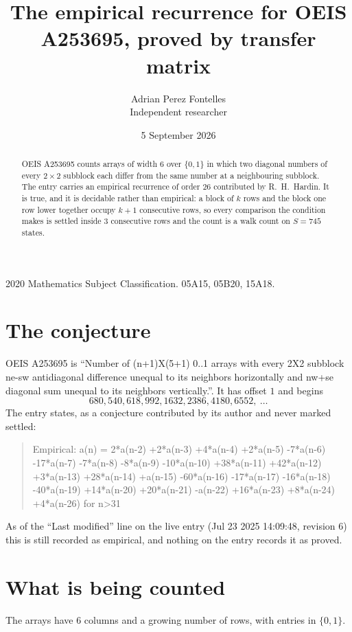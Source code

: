 \documentclass[11pt,a4paper]{article}
\title{The empirical recurrence for OEIS A253695, proved by transfer matrix}
\author{Adrian Perez Fontelles\\ \small Independent researcher}
\date{5 September 2026}
\theoremstyle{plain}
\theoremstyle{definition}
\begin{document}
\maketitle

\begin{abstract}
OEIS A253695 counts arrays of width $6$ over $\{0,1\}$ in which two diagonal numbers of every $2\times2$ subblock each differ from the same number at a neighbouring subblock. The entry carries an
empirical recurrence of order $26$ contributed by R.~H.~Hardin. It is true, and it is
decidable rather than empirical: a block of $k$ rows and the block one row lower together
occupy $k+1$ consecutive rows, so every comparison the condition makes is settled inside
$3$ consecutive rows and the count is a walk count on $S=745$ states.
\end{abstract}

\noindent\small 2020 Mathematics Subject Classification. 05A15, 05B20, 15A18.\normalsize

\section{The conjecture}

OEIS A253695 is ``Number of (n+1)X(5+1) 0..1 arrays with every 2X2 subblock ne-sw antidiagonal difference unequal to its neighbors horizontally and nw+se diagonal sum unequal to its neighbors vertically.''. It has offset $1$ and begins
\[
680, 540, 618, 992, 1632, 2386, 4180, 6552,\ \dots
\]
The entry states, as a conjecture contributed by its author and never marked settled:
\begin{quote}
Empirical: a(n) = 2*a(n-2) +2*a(n-3) +4*a(n-4) +2*a(n-5) -7*a(n-6) -17*a(n-7) -7*a(n-8) -8*a(n-9) -10*a(n-10) +38*a(n-11) +42*a(n-12) +3*a(n-13) +28*a(n-14) +a(n-15) -60*a(n-16) -17*a(n-17) -16*a(n-18) -40*a(n-19) +14*a(n-20) +20*a(n-21) -a(n-22) +16*a(n-23) +8*a(n-24) +4*a(n-26) for n>31
\end{quote}
As of the ``Last modified'' line on the live entry (Jul 23 2025 14:09:48, revision 6) this is still
recorded as empirical, and nothing on the entry records it as proved.

\section{What is being counted}

The arrays have $6$ columns and a growing number of rows, with entries in $\{0,1\}$.
\end{document}
